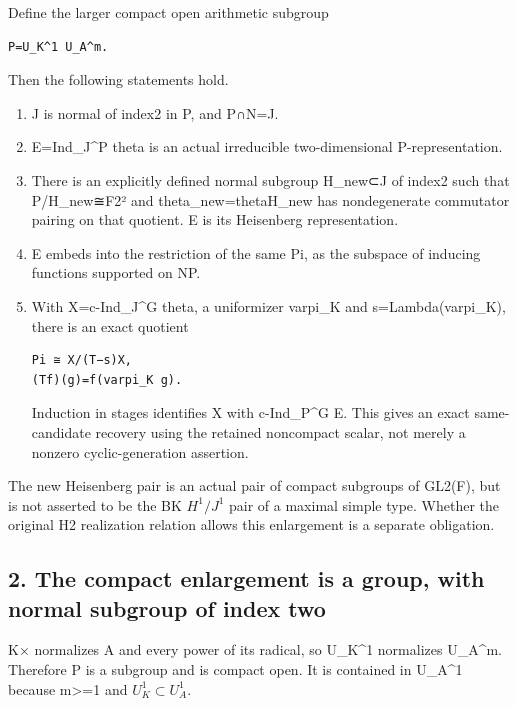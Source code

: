 Define the larger compact open arithmetic subgroup

\begin{Verbatim}[fontsize=\small,breaklines=true,breakanywhere=true]
P=U_K^1 U_A^m.
\end{Verbatim}

Then the following statements hold.

\begin{enumerate}
\def\labelenumi{\arabic{enumi}.}
\item
  J is normal of index2 in P, and P∩N=J.
\item
  E=Ind\_J\^{}P theta is an actual irreducible two-dimensional
  P-representation.
\item
  There is an explicitly defined normal subgroup H\_new⊂J of index2 such
  that P/H\_new≅F2² and theta\_new=theta\textbar H\_new has
  nondegenerate commutator pairing on that quotient. E is its Heisenberg
  representation.
\item
  E embeds into the restriction of the same Pi, as the subspace of
  inducing functions supported on NP.
\item
  With X=c-Ind\_J\^{}G theta, a uniformizer varpi\_K and
  s=Lambda(varpi\_K), there is an exact quotient

\begin{Verbatim}[fontsize=\small,breaklines=true,breakanywhere=true]
Pi ≅ X/(T−s)X,
(Tf)(g)=f(varpi_K g).
\end{Verbatim}

  Induction in stages identifies X with c-Ind\_P\^{}G E. This gives an
  exact same-candidate recovery using the retained noncompact scalar,
  not merely a nonzero cyclic-generation assertion.
\end{enumerate}

The new Heisenberg pair is an actual pair of compact subgroups of
GL2(F), but is not asserted to be the BK \(H^1/J^1\) pair of
a maximal simple type. Whether the original H2 realization relation
allows this enlargement is a separate obligation.

\hypertarget{rank2-the-compact-enlargement-is-a-group-with-normal-subgroup-of-index-two}{%
\subsection{2. The compact enlargement is a group, with normal subgroup
of index
two}\label{rank2-the-compact-enlargement-is-a-group-with-normal-subgroup-of-index-two}}

K× normalizes A and every power of its radical, so U\_K\^{}1 normalizes
U\_A\^{}m. Therefore P is a subgroup and is compact open. It is
contained in U\_A\^{}1 because m\textgreater=1 and
\(U_K^1\subset U_A^1\).

